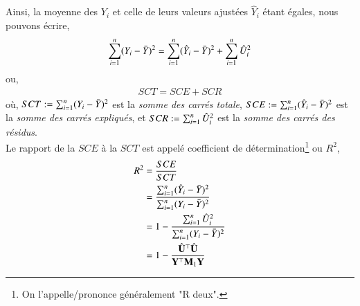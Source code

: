 \documentclass[10pt, reqno]{amsart}
\begin{document}
Ainsi, la moyenne des $Y_i$ et celle de leurs valeurs ajustées $\hat{Y}_i$ étant égales, nous pouvons écrire,
\begin{align*}
\sum_{i=1}^n(Y_i-\bar{Y})^2 = \sum_{i=1}^n(\hat{Y}_i - \bar{Y})^2 + \sum_{i=1}^n \hat{U}_i^2
\end{align*}
ou,
\begin{align*}
SCT = SCE + SCR
\end{align*}
où,
$SCT := \sum_{i=1}^n(Y_i-\bar{Y})^2$ est la \emph{somme des carrés totale},  $SCE :=  \sum_{i=1}^n(\hat{Y}_i - \bar{Y})^2$  est la \emph{somme des carrés expliqués}, et $SCR:= \sum_{i=1}^n \hat{U}_i^2$ est la \emph{somme des carrés des résidus}.\\
Le rapport de la $SCE$ à la $SCT$ est appelé coefficient de détermination\footnote{On l'appelle/prononce généralement "R deux".} ou $R^2$,
\begin{align*}
R^2 &= \frac{SCE}{SCT}\\
& = \frac{ \sum_{i=1}^n(\hat{Y}_i - \bar{Y})^2}{\sum_{i=1}^n(Y_i-\bar{Y})^2}\\
&=1 - \frac{\sum_{i=1}^n \hat{U}_i^2}{\sum_{i=1}^n(Y_i-\bar{Y})^2}\\
& = 1 - \frac{\hat{\mathbf U}^\top\hat{\mathbf U}}{\mathbf Y^\top\mathbf M_1\mathbf Y}
\end{align*}
\end{document}
